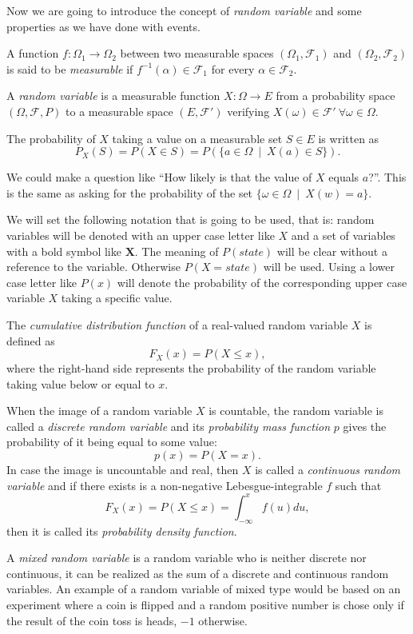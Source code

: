 Now we are going to introduce the concept of \emph{random variable} and some
properties as we have done with events.

\begin{definition}
A function \(f:\Omega_1 \to \Omega_2\) between two
measurable spaces \((\Omega_1, \mathcal{F}_1)\) and \((\Omega_2, \mathcal{F}_2)\) is said to be \emph{measurable} if \(f^{-1}(\alpha) \in \mathcal{F}_1\) for every \(\alpha \in \mathcal{F}_2\).
\end{definition}

\begin{definition}
  A \emph{random variable} is a measurable function \(X:\Omega \to E\) from a probability
  space \((\Omega, \mathcal{F}, P)\) to a measurable space \((E,
  \mathcal{F}')\) verifying \(X(\omega)\in \mathcal{F}' \ \forall \omega \in \Omega\).

The probability of \(X\) taking a value on a measurable set \(S \in E\) is
written as
\[
P_X(S) = P(X \in S) = P(\{a \in \Omega \ \mid  \ X(a) \in S \}).
\]
\end{definition}

We could make a question like ``How likely is that the value of \(X\) equals
\(a\)?''. This is the same as asking for the probability of the set \(\{\omega
\in \Omega \ \mid  \ X(w) = a\}\).

We will set the following notation that is going to be used, that is: random variables will be
denoted with an upper case letter like \(X\) and a set of variables with a
bold symbol like \(\bm{X}\). The meaning of \(P(state)\) will be clear without a reference to the variable.
Otherwise \(P(X = state)\) will be used.
Using a lower case letter like \(P(x)\) will denote the probability of the
corresponding upper case variable \(X\) taking a specific value.

\begin{definition}
The \emph{cumulative distribution function} of a real-valued random variable \(X\) is defined as
\[
F_X (x) = P(X \leq x),
\]
where the right-hand side represents the probability of the random variable
taking value below or equal to \(x\).
\end{definition}

\begin{definition}
When the image of a random variable \(X\) is countable, the random variable
is called a
\emph{discrete random variable} and its \emph{probability mass function} \(p\) gives the
probability of it being equal to some value:
\[
p(x) = P(X = x).
\]
In case the image is uncountable and real, then \(X\) is called a \emph{continuous random
  variable} and if there exists is a non-negative
Lebesgue-integrable \(f\) such that
\[
F_X(x) = P(X \leq x) = \int_{-\infty}^x f(u) du,
\]
then it is called its \emph{probability density function}.

A \emph{mixed random variable} is a random variable who is neither discrete nor
continuous, it can be realized as the sum of a discrete and continuous random
variables. An example of a random variable of mixed type would be based on an
experiment where a coin is flipped and a random positive number is chose only if
the result of the coin toss is heads, $-1$ otherwise.
\end{definition}

